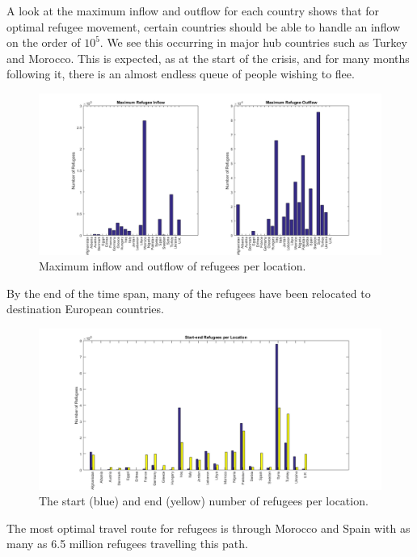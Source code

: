 \documentclass{article}
\begin{document}
A look at the maximum inflow and outflow for each country shows that for optimal refugee movement, certain countries should be able to handle an inflow on the order of $10^5$. We see this occurring in major hub countries such as Turkey and Morocco. This is expected, as at the start of the crisis, and for many months following it, there is an almost endless queue of people wishing to flee.


\begin{figure}[H]
    \centering
    \includegraphics[width=\textwidth]{Sensitivity/baseflow.png}
    \caption [width=0.9\textwidth]{\centering Maximum inflow and outflow of refugees per location.}
\end{figure}

By the end of the time span, many of the refugees have been relocated to destination European countries. 

\begin{figure}[H]
    \centering
    \includegraphics[width=\textwidth]{Sensitivity/basepop1.png}
    \caption [width=0.9\textwidth]{\centering The start (blue) and end (yellow) number of refugees per location.}
\end{figure}

The most optimal travel route for refugees is through Morocco and Spain with as many as 6.5 million refugees travelling this path.
\end{document}
